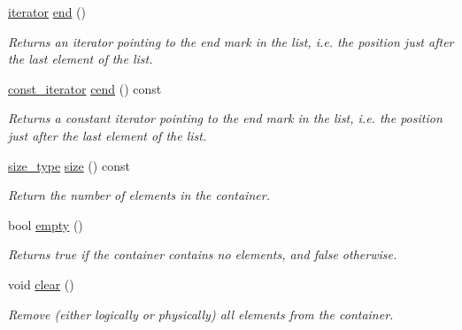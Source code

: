 \begin{DoxyCompactItemize}
\mbox{\label{classls_1_1list_a23e842f652b4da5c445499dc81e67934}} 
\hyperlink{classls_1_1list_af036cf72da26107a5084c1e4b45b9cb7}{iterator} \hyperlink{classls_1_1list_a23e842f652b4da5c445499dc81e67934}{end} ()
\begin{DoxyCompactList}\small\item\em Returns an iterator pointing to the end mark in the list, i.\+e. the position just after the last element of the list. \end{DoxyCompactList}\item 
\mbox{\label{classls_1_1list_ac8d06153e963e892c146bc227cfbb96c}} 
\hyperlink{classls_1_1list_ad543276e86075caadf97ae64f2fc7cfc}{const\+\_\+iterator} \hyperlink{classls_1_1list_ac8d06153e963e892c146bc227cfbb96c}{cend} () const
\begin{DoxyCompactList}\small\item\em Returns a constant iterator pointing to the end mark in the list, i.\+e. the position just after the last element of the list. \end{DoxyCompactList}\item 
\mbox{\label{classls_1_1list_a3cfcda5a97910595ab9268150a1f6019}} 
\hyperlink{classls_1_1list_a91bb77719712ad6127f0bdf97ed5bd64}{size\+\_\+type} \hyperlink{classls_1_1list_a3cfcda5a97910595ab9268150a1f6019}{size} () const
\begin{DoxyCompactList}\small\item\em Return the number of elements in the container. \end{DoxyCompactList}\item 
\mbox{\label{classls_1_1list_a661ae23af20249a5acd872b5981d222d}} 
bool \hyperlink{classls_1_1list_a661ae23af20249a5acd872b5981d222d}{empty} ()
\begin{DoxyCompactList}\small\item\em Returns true if the container contains no elements, and false otherwise. \end{DoxyCompactList}\item 
\mbox{\label{classls_1_1list_a94d588131af6f58af50f85debcc1cd0d}} 
void \hyperlink{classls_1_1list_a94d588131af6f58af50f85debcc1cd0d}{clear} ()
\begin{DoxyCompactList}\small\item\em Remove (either logically or physically) all elements from the container. \end{DoxyCompactList}\item 

\end{DoxyCompactItemize}
